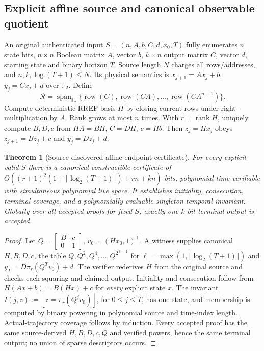 \documentclass[11pt]{article}
\newtheorem{theorem}{Theorem}
\begin{document}
\subsection{Explicit affine source and canonical observable quotient}
An original authenticated input $S=(n,A,b,C,d,x_0,T)$ fully enumerates $n$ state bits, $n\times n$ Boolean matrix $A$, vector $b$, $k\times n$ output matrix $C$, vector $d$, starting state and binary horizon $T$. Source length $N$ charges all rows/addresses, and $n,k,\log(T+1)\le N$. Its physical semantics is $x_{j+1}=Ax_j+b$, $y_j=Cx_j+d$ over $\mathbb F_2$. Define
\[
\mathcal R=\operatorname{span}_{\mathbb F_2}\{\operatorname{row}(C),\operatorname{row}(CA),\ldots,\operatorname{row}(CA^{n-1})\}.
\]
Compute deterministic RREF basis $H$ by closing current rows under right-multiplication by $A$. Rank grows at most $n$ times. With $r=\operatorname{rank}H$, uniquely compute $B,D,c$ from $HA=BH$, $C=DH$, $c=Hb$. Then $z_j=Hx_j$ obeys $z_{j+1}=Bz_j+c$ and $y_j=Dz_j+d$.
\begin{theorem}[Source-discovered affine endpoint certificate]
For every explicit valid $S$ there is a canonical constructible certificate of $O((r+1)^2(1+\lceil\log_2(T+1)\rceil)+rn+kn)$ bits, polynomial-time verifiable with simultaneous polynomial live space. It establishes initiality, consecution, terminal coverage, and a polynomially evaluable singleton temporal invariant. Globally over \emph{all} accepted proofs for fixed $S$, exactly one $k$-bit terminal output is accepted.
\end{theorem}
\begin{proof}
Let $Q=\begin{bmatrix}B&c\\0&1\end{bmatrix}$, $v_0=(Hx_0,1)^\top$. A witness supplies canonical $H,B,D,c$, the table $Q,Q^2,Q^4,\ldots,Q^{2^{\ell-1}}$ for $\ell=\max(1,\lceil\log_2(T+1)\rceil)$ and $y_T=D\pi_r(Q^Tv_0)+d$. The verifier rederives $H$ from the original source and checks each squaring and claimed output. Initiality and consecution follow from $H(Ax+b)=B(Hx)+c$ for \emph{every} explicit state $x$. The invariant $I(j,z):=[z=\pi_r(Q^jv_0)]$, for $0\le j\le T$, has one state, and membership is computed by binary powering in polynomial source and time-index length. Actual-trajectory coverage follows by induction. Every accepted proof has the same source-derived $H,B,D,c,Q$ and verified powers, hence the same terminal output; no union of sparse descriptors occurs.
\end{proof}
\end{document}
